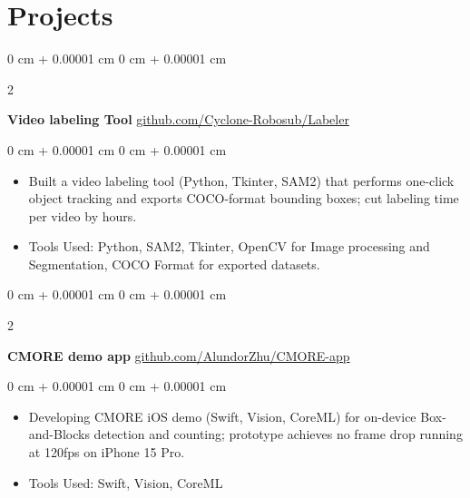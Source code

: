 \documentclass[10pt, letterpaper]{article}
\newenvironment{highlights}{
    \begin{itemize}[
        topsep=0.10 cm,
        parsep=0.10 cm,
        partopsep=0pt,
        itemsep=0pt,
        leftmargin=0 cm + 10pt
    ]
}{
    \end{itemize}
} %
\newenvironment{onecolentry}{
    \begin{adjustwidth}{
        0 cm + 0.00001 cm
    }{
        0 cm + 0.00001 cm
    }
}{
    \end{adjustwidth}
} %
\newenvironment{twocolentry}[2][]{
    \onecolentry
    \def\secondColumn{#2}
    \setcolumnwidth{\fill, 6 cm}
    \begin{paracol}{2}
}{
    \switchcolumn \raggedleft \secondColumn
    \end{paracol}
    \endonecolentry
} %
\begin{document}
    
    \section{Projects}



        
        \begin{twocolentry}{
            \href{https://github.com/Cyclone-Robosub/Labeler}{github.com/Cyclone-Robosub/Labeler}
        }
            \textbf{Video labeling Tool}\end{twocolentry}

        \vspace{0.10 cm}
        \begin{onecolentry}
            \begin{highlights}
                \item Built a video labeling tool (Python, Tkinter, SAM2) that performs one-click object tracking and exports COCO-format bounding boxes; cut labeling time per video by hours.  
                \item Tools Used: Python, SAM2, Tkinter, OpenCV for Image processing and Segmentation, COCO Format for exported datasets. 
            \end{highlights}
        \end{onecolentry}


        \vspace{0.2 cm}

        \begin{twocolentry}{
            \href{https://github.com/AlundorZhu/CMORE-app}{github.com/AlundorZhu/CMORE-app}
        }
            \textbf{CMORE demo app}\end{twocolentry}

        \vspace{0.10 cm}
        \begin{onecolentry}
            \begin{highlights}
                \item Developing CMORE iOS demo (Swift, Vision, CoreML) for on-device Box-and-Blocks detection and counting; prototype achieves no frame drop running at 120fps on iPhone 15 Pro.
                \item Tools Used: Swift, Vision, CoreML
            \end{highlights}
        \end{onecolentry}


        \vspace{0.2 cm}
\end{document}

